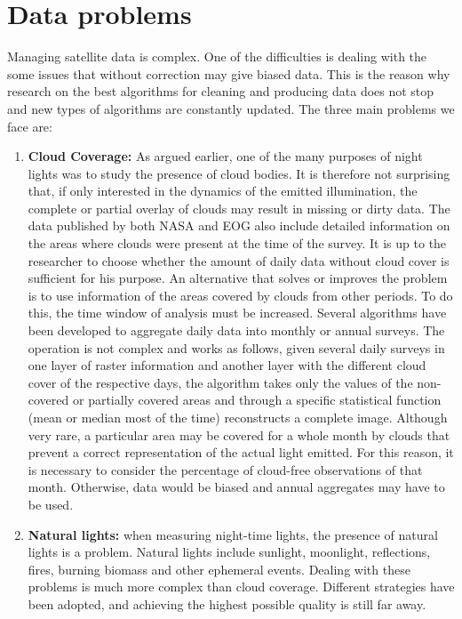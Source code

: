 \section{Data problems}
Managing satellite data is complex. One of the difficulties is dealing with the some issues that without correction may give biased data. This is the reason why research on the best algorithms for cleaning and producing data does not stop and new types of algorithms are constantly updated. The three main problems we face are:
\begin{enumerate}
\item \textbf{Cloud Coverage:} As argued earlier, one of the many purposes of night lights was to study the presence of cloud bodies. It is therefore not surprising that, if only interested in the dynamics of the emitted illumination, the complete or partial overlay of clouds may result in missing or dirty data. 
The data published by both NASA and EOG also include detailed information on the areas where clouds were present at the time of the survey. It is up to the researcher to choose whether the amount of daily data without cloud cover is sufficient for his purpose. 
An alternative that solves or improves the problem is to use information of the areas covered by clouds from other periods. To do this, the time window of analysis must be increased. Several algorithms have been developed to aggregate daily data into monthly or annual surveys. 
The operation is not complex and works as follows, given several daily surveys in one layer of raster information and another layer with the different cloud cover of the respective days, the algorithm takes only the values of the non-covered or partially covered areas and through a specific statistical function (mean or median most of the time) reconstructs a complete image.
Although very rare, a particular area may be covered for a whole month by clouds that prevent a correct representation of the actual light emitted. For this reason, it is necessary to consider the percentage of cloud-free observations of that month. Otherwise, data would be biased and annual aggregates may have to be used.
\item \textbf{Natural lights:} when measuring night-time lights, the presence of natural lights is a problem. Natural lights include sunlight, moonlight, reflections, fires, burning biomass and other ephemeral events.
Dealing with these problems is much more complex than cloud coverage. Different strategies have been adopted, and achieving the highest possible quality is still far away. 

\end{enumerate}
